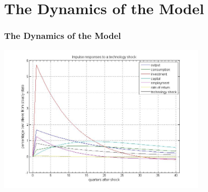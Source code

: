 \documentclass[handout]{beamer}
\begin{document}
\section{The Dynamics of the Model}

\begin{frame}

\frametitle{The Dynamics of the Model}\vskip 0.1in
\centering
\includegraphics[width = 4.0in]{hansenrbctechshockcombinedslides.jpg}
\end{frame}
\end{document}
